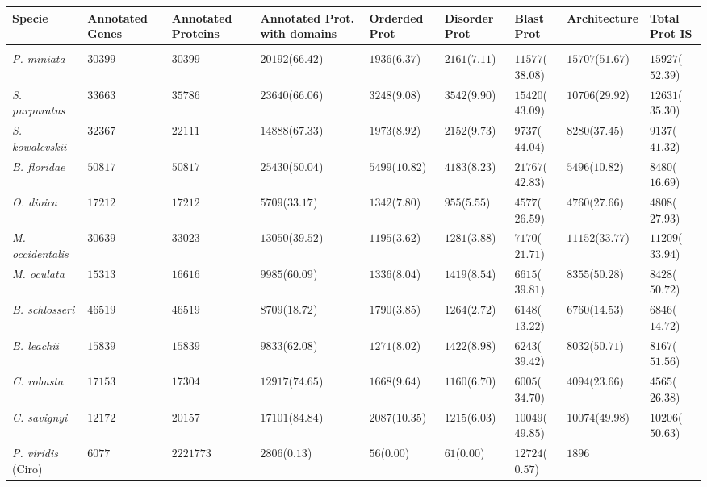 \documentclass[11pt]{article}
\begin{document}
\begin{table}
\small
\centering
\begin{tabular}{p{3.2cm}p{2cm}p{2cm}p{2cm}p{2cm}p{2cm}p{2.1cm}p{2.7cm}p{2.6cm}}
\toprule
\textbf{Specie}&        \textbf{Annotated Genes}&\textbf{Annotated 
Proteins}&\textbf{Annotated Prot. with domains}&\textbf{Orderded 
Prot}&\textbf{Disorder Prot}&\textbf{Blast 
Prot}&\textbf{Architecture}&\textbf{Total Prot IS} \\ \midrule\\
\textsl{P. miniata}&    
$30399$&$30399$&$20192$($66.42$)&$1936$($6.37$)&$2161$($7.11$)&$11577$($38.08$)&
$15707$($51.67$)&$15927$($52.39$)\\
\textsl{S. purpuratus}& 
$33663$&$35786$&$23640$($66.06$)&$3248$($9.08$)&$3542$($9.90$)&$15420$($43.09$)&
$10706$($29.92$)&$12631$($35.30$)\\
\textsl{S. kowalevskii}&        
$32367$&$22111$&$14888$($67.33$)&$1973$($8.92$)&$2152$($9.73$)&$9737$($44.04$)&$
8280$($37.45$)&$9137$($41.32$) \\
\midrule
\textsl{B. floridae}&   
$50817$&$50817$&$25430$($50.04$)&$5499$($10.82$)&$4183$($8.23$)&$21767$($42.83$)
&$5496$($10.82$)&$8480$($16.69$)\\
\midrule
\textsl{O. dioica}&     
$17212$&$17212$&$5709$($33.17$)&$1342$($7.80$)&$955$($5.55$)&$4577$($26.59$)&$47
60$($27.66$)&$4808$($27.93$)\\
\textsl{M. occidentalis}&       
$30639$&$33023$&$13050$($39.52$)&$1195$($3.62$)&$1281$($3.88$)&$7170$($21.71$)&$
11152$($33.77$)&$11209$($33.94$)\\
\textsl{M. oculata}&    
$15313$&$16616$&$9985$($60.09$)&$1336$($8.04$)&$1419$($8.54$)&$6615$($39.81$)&$8
355$($50.28$)&$8428$($50.72$)\\
\textsl{B. schlosseri}& 
$46519$&$46519$&$8709$($18.72$)&$1790$($3.85$)&$1264$($2.72$)&$6148$($13.22$)&$6
760$($14.53$)&$6846$($14.72$)\\
\textsl{B. leachii}&    
$15839$&$15839$&$9833$($62.08$)&$1271$($8.02$)&$1422$($8.98$)&$6243$($39.42$)&$8
032$($50.71$)&$8167$($51.56$)\\
\textsl{C. robusta}&       
$17153$&$17304$&$12917$($74.65$)&$1668$($9.64$)&$1160$($6.70$)&$6005$($34.70$)&$
4094$($23.66$)&$4565$($26.38$)\\
\textsl{C. savignyi}&   
$12172$&$20157$&$17101$($84.84$)&$2087$($10.35$)&$1215$($6.03$)&$10049$($49.85$)
&$10074$($49.98$)&$10206$($50.63$)\\
\textsl{P. viridis} (Ciro)&     
$6077$&$2221773$&$2806$($0.13$)&$56$($0.00$)&$61$($0.00$)&$12724$($0.57$)&$1896$

\end{tabular}
\end{table}
\end{document}
